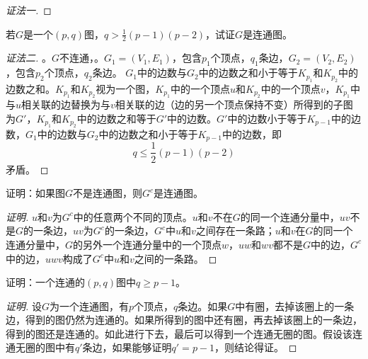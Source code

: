 \documentclass{beamer}
\begin{document}
\begin{CJK}{UTF8}{gbsn}
\begin{frame}
{\begin{proof}[证法一]
\end{proof}}
\end{frame}
\begin{frame}
  \begin{Exercise}
    若$G$是一个$(p,q)$图，$q > \frac{1}{2}(p-1)(p-2)$，试证$G$是连通图。  
  \end{Exercise}
\pause\begin{proof}[证法二]\justifying\let\raggedright\justifying
  。$G$不连通，。$G_1=(V_1,E_1)$，包含$p_1$个顶点，$q_1$条边，$G_2=(V_2,E_2)$，包含$p_2$个顶点，$q_2$条边。
  $G_1$中的边数与$G_2$中的边数之和小于等于$K_{p_1}$和$K_{p_2}$中的边数之和。$K_{p_1}$和$K_{p_2}$视为一个图，$K_{p_1}$中的一个顶点$u$和$K_{p_2}$中的一个顶点$v$，$K_{p_1}$中与$u$相关联的边替换为与$v$相关联的边（边的另一个顶点保持不变）所得到的子图为$G'$，$K_{p_1}$和$K_{p_2}$中的边数之和等于$G'$中的边数。$G'$中的边数小于等于$K_{p-1}$中的边数，$G_1$中的边数与$G_2$中的边数之和小于等于$K_{p-1}$中的边数，即
  \[q\leq \frac{1}{2}(p-1)(p-2)\]
  矛盾。
\end{proof}
\end{frame}
\begin{frame}
  \begin{Exercise}
  证明：如果图$G$不是连通图，则$G^c$是连通图。
\end{Exercise}
\pause\begin{proof}[证明]\justifying\let\raggedright\justifying
  $u$和$v$为$G^c$中的任意两个不同的顶点。$u$和$v$不在$G$的同一个连通分量中，$uv$不是$G$的一条边，$uv$为$G^c$的一条边，$G^c$中$u$和$v$之间存在一条路；$u$和$v$在$G$的同一个连通分量中，$G$的另外一个连通分量中的一个顶点$w$，$uw$和$wv$都不是$G$中的边，$G^c$中的边，$uwv$构成了$G^c$中$u$和$v$之间的一条路。
\end{proof}
\end{frame}
\begin{frame}
    \begin{Exercise}
  证明：一个连通的$(p,q)$图中$q\geq p - 1$。  
  \end{Exercise}
  \begin{proof}[证明]
    设$G$为一个连通图，有$p$个顶点，$q$条边。如果$G$中有圈，去掉该圈上的一条边，得到的图仍然为连通的。如果所得到的图中还有圈，再去掉该圈上的一条边，得到的图还是连通的。如此进行下去，最后可以得到一个连通无圈的图。假设该连通无圈的图中有$q'$条边，如果能够证明$q'=p-1$，则结论得证。


\end{proof}
\end{frame}
\end{CJK}
\end{document}
